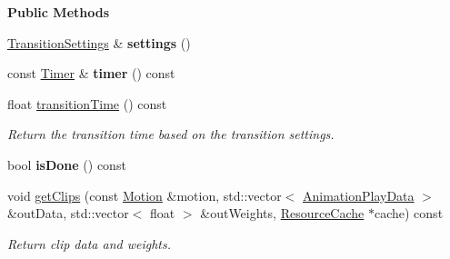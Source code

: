 \begin{Indent}\textbf{ Public Methods}\par
\begin{DoxyCompactItemize}
\item 
\mbox{\label{classrev_1_1_animation_transition_a6b140ed478cb97538c2c30b3c81e4cf2}} 
\mbox{\hyperlink{classrev_1_1_transition_settings}{Transition\+Settings}} \& {\bfseries settings} ()
\item 
\mbox{\label{classrev_1_1_animation_transition_a96ca0497e3a03952ee77edf058171990}} 
const \mbox{\hyperlink{classrev_1_1_timer}{Timer}} \& {\bfseries timer} () const
\item 
\mbox{\label{classrev_1_1_animation_transition_a7a19dd42a7e92f1fdf1eebd9ee0b0962}} 
float \mbox{\hyperlink{classrev_1_1_animation_transition_a7a19dd42a7e92f1fdf1eebd9ee0b0962}{transition\+Time}} () const
\begin{DoxyCompactList}\small\item\em Return the transition time based on the transition settings. \end{DoxyCompactList}\item 
\mbox{\label{classrev_1_1_animation_transition_a7a026a83bc1812d07fcb8c7843203bdb}} 
bool {\bfseries is\+Done} () const
\item 
\mbox{\label{classrev_1_1_animation_transition_a3913ca07f7870fb146c0fef62fc2231b}} 
void \mbox{\hyperlink{classrev_1_1_animation_transition_a3913ca07f7870fb146c0fef62fc2231b}{get\+Clips}} (const \mbox{\hyperlink{classrev_1_1_motion}{Motion}} \&motion, std\+::vector$<$ \mbox{\hyperlink{structrev_1_1_animation_play_data}{Animation\+Play\+Data}} $>$ \&out\+Data, std\+::vector$<$ float $>$ \&out\+Weights, \mbox{\hyperlink{classrev_1_1_resource_cache}{Resource\+Cache}} $\ast$cache) const
\begin{DoxyCompactList}\small\item\em Return clip data and weights. \end{DoxyCompactList}\item 
\mbox{\label{classrev_1_1_animation_transition_a84aeee34c4e5fc22415095218d04d797}} 

\end{DoxyCompactItemize}
\end{Indent}
